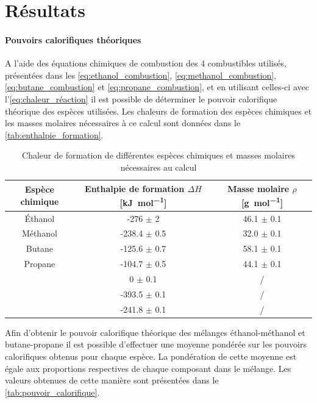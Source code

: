\section{Résultats}

\paragraph*{Pouvoirs calorifiques théoriques}
A l'aide des équations chimiques de combustion des 4 combustibles utilisés, présentées dans les \autoref{eq:ethanol_combustion}, \autoref{eq:methanol_combustion}, \autoref{eq:butane_combustion} et \autoref{eq:propane_combustion}, et en utilisant celles-ci avec l'\autoref{eq:chaleur_réaction} il est possible de déterminer le pouvoir calorifique théorique des espèces utilisées. Les chaleurs de formation des espèces chimiques et les masses molaires nécessaires à ce calcul sont données dans le \autoref{tab:enthalpie_formation}.

\begin{table}[h]
    \centering
    \begin{tabulary}{\linewidth}{C C C}
        \toprule
        Espèce chimique & Enthalpie de formation \(\Delta H\) [\si{\kilo\joule\per\mole}] & Masse molaire \(\rho\) [\si{\gram\per\mole}]\\
        \midrule
        Éthanol & -276 \(\pm\) 2 & 46.1 \(\pm\) 0.1 \\
        Méthanol & -238.4 \(\pm\) 0.5 & 32.0 \(\pm\) 0.1 \\
        Butane & -125.6 \(\pm\) 0.7 & 58.1 \(\pm\) 0.1\\
        Propane & -104.7 \(\pm\) 0.5 & 44.1 \(\pm\) 0.1\\
         & 0 \(\pm\) 0.1 & / \\
         & -393.5 \(\pm\) 0.1 & / \\
         & -241.8 \(\pm\) 0.1 & / \\
        \bottomrule
    \end{tabulary}
    \caption{Chaleur de formation de différentes espèces chimiques et masses molaires nécessaires au calcul \cite{notice} \cite{NIST}}
    \label{tab:enthalpie_formation}
\end{table}

Afin d'obtenir le pouvoir calorifique théorique des mélanges éthanol-méthanol et butane-propane il est possible d'effectuer une moyenne pondérée sur les pouvoirs calorifiques obtenus pour chaque espèce. La pondération de cette moyenne est égale aux proportions respectives de chaque composant dans le mélange. Les valeurs obtenues de cette manière sont présentées dans le \autoref{tab:pouvoir_calorifique}.

